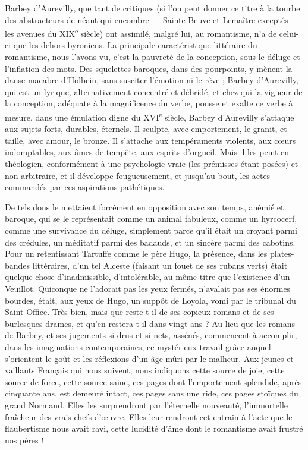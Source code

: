 \documentclass[french,twoside]{book} %
\begin{document}
Barbey d’Aurevilly, que tant de critiques (si l’on peut donner ce titre à la tourbe des abstracteurs de néant qui encombre — Sainte-Beuve et Lemaître exceptés — les avenues du XIX\textsuperscript{e} siècle) ont assimilé, malgré lui, au romantisme, n’a de celui-ci que les dehors byroniens. La principale caractéristique littéraire du romantisme, nous l’avons vu, c’est la pauvreté de la conception, sous le déluge et l’inflation des mots. Des squelettes baroques, dans des pourpoints, y mènent la danse macabre d’Holbein, sans susciter l’émotion ni le rêve ; Barbey d’Aurevilly, qui est un lyrique, alternativement concentré et débridé, et chez qui la vigueur de la conception, adéquate à la magnificence du verbe, pousse et exalte ce verbe à mesure, dans une émulation digne du XVI\textsuperscript{e} siècle, Barbey d’Aurevilly s’attaque aux sujets forts, durables, éternels. Il sculpte, avec emportement, le granit, et taille, avec amour, le bronze. Il s’attache aux tempéraments violents, aux cœurs indomptables, aux âmes de tempête, aux esprits d’orgueil. Mais il les peint en théologien, conformément à une psychologie vraie (les prémisses étant posées) et non arbitraire, et il développe fougueusement, et jusqu’au bout, les actes commandés par ces aspirations pathétiques.\par
De tels dons le mettaient forcément en opposition avec son temps, anémié et baroque, qui se le représentait comme un animal fabuleux, comme un hyrcocerf, comme une survivance du déluge, simplement parce qu’il était un croyant parmi des crédules, un méditatif parmi des badauds, et un sincère parmi des cabotins. Pour un retentissant Tartuffe comme le père Hugo, la présence, dans les plates-bandes littéraires, d’un tel Alceste (faisant un fouet de ses rubans verts) était quelque chose d’inadmissible, d’intolérable, au même titre que l’existence d’un Veuillot. Quiconque ne l’adorait pas les yeux fermés, n’avalait pas ses énormes bourdes, était, aux yeux de Hugo, un suppôt de Loyola, vomi par le tribunal du Saint-Office. Très bien, mais que reste-t-il de ses copieux romans et de ses burlesques drames, et qu’en restera-t-il dans vingt ans ? Au lieu que les romans de Barbey, et ses jugements si drus et si nets, assénés, commencent à accomplir, dans les imaginations contemporaines, ce mystérieux travail grâce auquel s’orientent le goût et les réflexions d’un âge mûri par le malheur. Aux jeunes et vaillants Français qui nous suivent, nous indiquons cette source de joie, cette source de force, cette source saine, ces pages dont l’emportement splendide, après cinquante ans, est demeuré intact, ces pages sans une ride, ces pages stoïques du grand Normand. Elles les surprendront par l’éternelle nouveauté, l’immortelle fraîcheur des vrais chefs-d’œuvre. Elles leur rendront cet entrain à l’acte que le flaubertisme nous avait ravi, cette lucidité d’âme dont le romantisme avait frustré nos pères !\par
\end{document}
